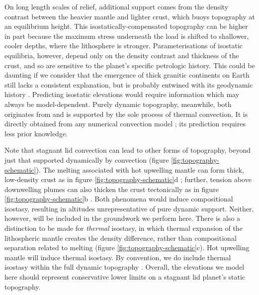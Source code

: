 \documentclass[trackchanges]{aastex63}
\begin{document}
On long length scales of relief, additional support comes from the density contrast between the heavier mantle and lighter crust, which buoys topography at an equilibrium height. This isostatically-compensated topography can be higher in part because the maximum stress underneath the load is shifted to shallower, cooler depths, where the lithosphere is stronger. Parameterisations of isostatic equilibria, however, depend only on the density contrast and thickness of the crust, and so are sensitive to the planet's specific petrologic history. This could be daunting if we consider that the emergence of thick granitic continents on Earth still lacks a consistent explanation, but is probably entwined with its geodynamic history \citep{lenardic_continental_2005,
korenaga_crustal_2018, honing_bifurcation_2019}. Predicting isostatic elevations would require information which may always be model-dependent. Purely dynamic topography, meanwhile, both originates from and is supported by the sole process of thermal convection. It is directly obtained from any numerical convection model \citep[e.g.,][]{mckenzie_surface_1977, kiefer_geoid_1992, kiefer_geoid_1998, huang_constraints_2013, arnould_scales_2018, lees_gravity_2020}; its prediction requires less prior knowledge.

Note that stagnant lid convection can lead to other forms of topography, beyond just that supported dynamically by convection (figure \ref{fig:topography-schematic}). The melting associated with hot upwelling mantle can form thick, low-density crust as in figure \ref{fig:topography-schematic}d \citep{stofan_large_1995}; further, tension above downwelling plumes can also thicken the crust tectonically as in figure \ref{fig:topography-schematic}b \citep{kiefer_mantle_1991,pysklywec_time-dependent_2003, zampa_evidence_2018}. Both phenomena would induce compositional isostasy, resulting in altitudes unrepresentative of pure dynamic support. Neither, however, will be included in the groundwork we perform here. There is also a distinction to be made for \textit{thermal} isostasy, in which thermal expansion of the lithospheric mantle creates the density difference, rather than compositional separation related to melting (figure \ref{fig:topography-schematic}c). Hot upwelling mantle will induce thermal isostasy. By convention, we do include thermal isostasy within the full dynamic topography \citep[see][]{molnar_mantle_2015, hoggard_observational_2021}. Overall, the elevations we model here should represent conservative lower limits on a stagnant lid planet's static topography.
\end{document}
